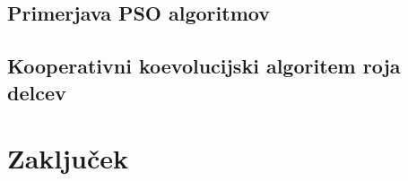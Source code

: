 
\section{Primerjava PSO algoritmov}


\section{Kooperativni koevolucijski algoritem roja delcev}


\chapter{Zaključek}\label{chap:end}

